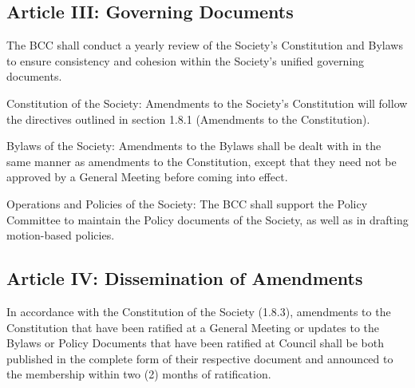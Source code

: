 \subsection{Article III: Governing Documents}
\begin{longenum}[ label*=\thesubsection.\arabic*., align=left] 
\item The BCC shall conduct a yearly review of the Society's Constitution and Bylaws to ensure consistency and cohesion within the Society's unified governing documents.
\item Constitution of the Society: Amendments to the Society's Constitution will follow the directives outlined in section 1.8.1 (Amendments to the Constitution).
\item Bylaws of the Society: Amendments to the Bylaws shall be dealt with in the same manner as amendments to the Constitution, except that they need not be approved by a General Meeting before coming into effect.
\item Operations and Policies of the Society: The BCC shall support the Policy Committee to maintain the Policy documents of the Society, as well as in drafting motion-based policies.
\end{longenum}

\subsection{Article IV: Dissemination of Amendments}
\begin{longenum}[ label*=\thesubsection.\arabic*., align=left] 
\item In accordance with the Constitution of the Society (1.8.3), amendments to the Constitution that have been ratified at a General Meeting or updates to the Bylaws or Policy Documents that have been ratified at Council shall be both published in the complete form of their respective document and announced to the membership within two (2) months of ratification.
\end{longenum}


















